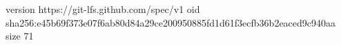 version https://git-lfs.github.com/spec/v1
oid sha256:e45b69f373e07f6ab80d84a29ce200950885fd1d61f3ecfb36b2eaced9c940aa
size 71
